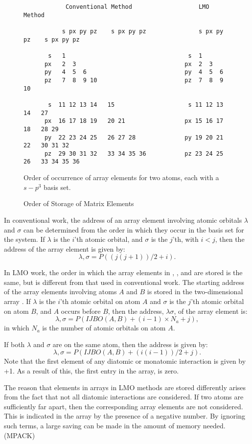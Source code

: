\begin{enumerate}
\begin{figure}
\begin{verbatim}
            Conventional Method                   LMO Method
      
           s px py pz    s px py pz               s px py pz    s px py pz

       s   1                                   s  1
      px   2  3                               px  2  3
      py   4  5  6                            py  4  5  6
      pz   7  8  9 10                         pz  7  8  9 10

       s  11 12 13 14   15                     s 11 12 13 14   27
      px  16 17 18 19   20 21                 px 15 16 17 18   28 29
      py  22 23 24 25   26 27 28              py 19 20 21 22   30 31 32
      pz  29 30 31 32   33 34 35 36           pz 23 24 25 26   33 34 35 36
\end{verbatim}
\begin{center}
Order of occurrence of array elements for two atoms, each with a $s-p^3$ basis
set.
\end{center}
\caption{\label{plhtm} Order of Storage of Matrix Elements}
\end{figure}

In conventional work, the address of an array element involving atomic orbitals
$\lambda$ and $\sigma$ can be determined from the order in which they occur in
the basis set for the system.  If $\lambda$ is the $i$'th atomic orbital, and
$\sigma$ is the $j$'th, with $i < j$, then the address of the array element is
given by:
$$
\lambda,\sigma  = P((j(j+1))/2+i).
$$

In LMO work, the order in which the array elements in ,  , and
 are stored is the same, but is different from that used in
conventional work. The starting address of the array elements involving atoms
$A$ and $B$ is stored in the two-dimensional array . If  $\lambda$
is the $i$'th atomic orbital on atom $A$ and  $\sigma$ is the $j$'th atomic
orbital on atom $B$, and $A$ occurs before $B$, then the address, $\lambda
\sigma$, of the array element is:
$$
\lambda,\sigma = P(IJBO(A,B)+(i-1)\times N_a+j),
$$
in which $N_a$ is the number of atomic orbitals on atom $A$.

If both $\lambda$ and $\sigma$ are on the same atom, then the address is given
by:
$$
\lambda,\sigma = P(IJBO(A,B)+(i(i-1))/2+j).
$$
Note that the first element of any diatomic or monatomic interaction is given
by +1.  As a result of this, the first entry in the 
 array,  is zero.

The reason that elements in arrays in LMO methods are stored differently arises
from the fact that not all diatomic interactions are considered. If two atoms
are sufficiently far apart, then the corresponding array elements are not
considered.  This is indicated in the  array by the presence of a
negative number.  By ignoring such terms, a large saving can be made in the
amount of memory needed. (MPACK)


\end{enumerate}

